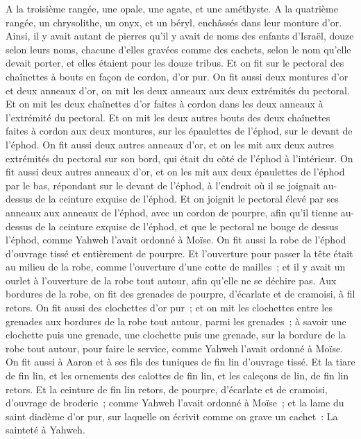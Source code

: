 \begin{multicols}{2}
A la troisième rangée, une opale, une agate, et une améthyste.
A la quatrième rangée, un chrysolithe, un onyx, et un béryl, enchâssés dans leur monture d'or.
Ainsi, il y avait autant de pierres qu'il y avait de noms des enfants d'Israël, douze selon leurs noms, chacune d'elles gravées comme des cachets, selon le nom qu'elle devait porter, et elles étaient pour les douze tribus.
Et on fit sur le pectoral des chaînettes à bouts en façon de cordon, d'or pur.
On fit aussi deux montures d'or et deux anneaux d'or, on mit les deux anneaux aux deux extrémités du pectoral.
Et on mit les deux chaînettes d'or faites à cordon dans les deux anneaux à l'extrémité du pectoral.
Et on mit les deux autres bouts des deux chaînettes faites à cordon aux deux montures, sur les épaulettes de l'éphod, sur le devant de l'éphod.
On fit aussi deux autres anneaux d'or, et on les mit aux deux autres extrémités du pectoral sur son bord, qui était du côté de l'éphod à l'intérieur.
On fit aussi deux autres anneaux d'or, et on les mit aux deux épaulettes de l'éphod par le bas, répondant sur le devant de l'éphod, à l'endroit où il se joignait au-dessus de la ceinture exquise de l'éphod.
Et on joignit le pectoral élevé par ses anneaux aux anneaux de l'éphod, avec un cordon de pourpre, afin qu'il tienne au-dessus de la ceinture exquise de l'éphod, et que le pectoral ne bouge de dessus l'éphod, comme Yahweh l'avait ordonné à Moïse.
On fit aussi la robe de l'éphod d'ouvrage tissé et entièrement de pourpre.
 Et l'ouverture pour passer la tête était au milieu de la robe, comme l'ouverture d'une cotte de mailles~; et il y avait un ourlet à l'ouverture de la robe tout autour, afin qu'elle ne se déchire pas.
Aux bordures de la robe, on fit des grenades de pourpre, d'écarlate et de cramoisi, à fil retors.
On fit aussi des clochettes d'or pur~; et on mit les clochettes entre les grenades aux bordures de la robe tout autour, parmi les grenades~;
à savoir une clochette puis une grenade, une clochette puis une grenade, sur la bordure de la robe tout autour, pour faire le service, comme Yahweh l'avait ordonné à Moïse.
On fit aussi à Aaron et à ses fils des tuniques de fin lin d'ouvrage tissé.
Et la tiare de fin lin, et les ornements des calottes de fin lin, et les caleçons de lin, de fin lin retors.
Et la ceinture de fin lin retors, de pourpre, d'écarlate et de cramoisi, d'ouvrage de broderie~; comme Yahweh l'avait ordonné à Moïse~;
et la lame du saint diadème d'or pur, sur laquelle on écrivit comme on grave un cachet~: La sainteté à Yahweh.

\end{multicols}
